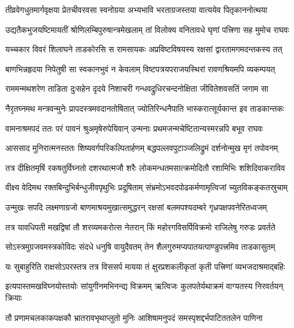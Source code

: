 \twolineshloka
{तीव्रवेगधुतमार्गवृक्षया प्रेतचीवरवसा स्वनोग्रया}
{अभ्यभावि भरताग्रजस्तया वात्ययेव पितृकाननोत्थया}%

\twolineshloka
{उद्यतैकभुजयष्टिमायतीं श्रोणिलम्बिपुरुषान्त्रमेखलाम्}
{तां विलोक्य वनितावधे घृणां पत्त्रिणा सह मुमोच राघवः}%

\twolineshloka
{यच्चकार विवरं शिलाघने ताडकोरसि स रामसायकः}
{अप्रविष्टविषयस्य रक्षसां द्वारतामगमदन्तकस्य तत्}%

\twolineshloka
{बाणभिन्नहृदया निपेतुषी सा स्वकानभुवं न केवलाम्}
{विष्टपत्रयपराजयस्थिरां रावणश्रियमपि व्यकम्पयत्}%

\twolineshloka
{राममन्मथशरेण ताडिता दुःसहेन दृदये निशाचरी}
{गन्धवद्रुधिरचन्दनोक्षिता जीवितेशवसतिं जगाम सा}%

\twolineshloka
{नैरृतघ्नमथ मन्त्रवन्मुनेः प्रापदस्त्रमवदानतोषितात्}
{ज्योतिरिन्धनैपाति भास्करात्सूर्यकान्त इव ताडकान्तकः}%

\twolineshloka
{वामनाश्रमपदं ततः परं पावनं श्रुअमृषेरुपेयिवान्}
{उन्मनाः प्रथमजन्मचेष्टितान्यस्मरन्नपि बभूव राघवः}%

\twolineshloka
{आससाद मुनिरात्मनस्ततः शिष्यवर्गपरिकल्पितार्हणम्}
{बद्धपल्लवपुटाञ्जलिद्रुमं दर्शनोन्मुख मृगं तपोवनम्}%

\twolineshloka
{तत्र दीक्षितमृषिं रकषतुर्विघ्नतो दशरथात्मजौ शरैः}
{लोकमन्धतमसात्क्रमोदितौ रशामिभिः शशिदिवाकराविव}%

\twolineshloka
{वीक्ष्य वेदिमथ रक्तबिन्दुभिर्बन्धुजीवपृथुभिः प्रदूषिताम्}
{संभ्रमोऽभवदपोढकर्मणामृत्विजां च्युतविकङ्कतस्रुचाम्}%

\twolineshloka
{उन्मुखः सपदि लक्ष्मणाग्रजो बाणमाश्रयमुखात्समुद्धरन्}
{रक्षसां बलमपश्यदम्बरे गृध्रपक्षपवनेरितध्वजम्}%

\twolineshloka
{तत्र यावधिपती मखद्विषां तौ शरव्यमकरोत्स नेतरान्}
{किं महोरगविसर्पिविक्रमो राजिलेषु गरुडः प्रवर्तते}%

\twolineshloka
{सोऽस्त्रमुग्रजवमस्त्रकोविदः संदधे धनुषि वायुदैवतम्}
{तेन शैलगुरुमप्यपातयत्पाण्डुपत्त्रमिव ताडकासुतम्}%

\twolineshloka
{यः सुबाहुरिति राक्षसोऽपरस्तत्र तत्र विससर्प मायया}
{तं क्षुरप्रशकलीकृतां कृती पत्त्रिणां व्यभजदाश्रमाद्बहिः}%

\twolineshloka
{इत्यपास्तमखविघ्नयोस्तयोः सांयुगीनमभिनन्द्य विक्रमम्}
{ऋत्विजः कुलपतेर्यथाक्रमं वाग्यतस्य निरवर्तयन् क्रियाः}%

\twolineshloka
{तौ प्रणामचलकाकपक्षकौ भ्रातरावभृथाप्लुतो मुनिः}
{आशिषामनुपदं समस्पृशद्दर्भपाटिततलेन पाणिना}%

